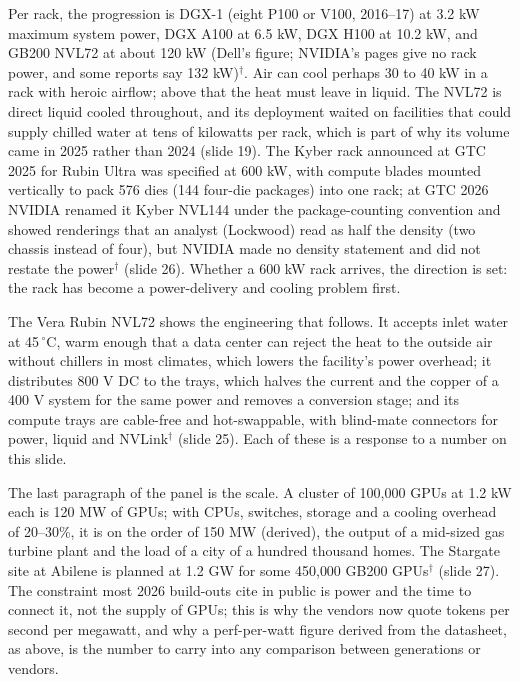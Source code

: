 \documentclass[11pt,letterpaper]{article}
\begin{document}
Per rack, the progression is DGX-1 (eight P100 or V100, 2016--17) at 3.2 kW maximum system power, DGX A100 at 6.5 kW, DGX H100 at 10.2 kW, and GB200 NVL72 at about 120 kW (Dell's figure; NVIDIA's pages give no rack power, and some reports say 132 kW)$^\dagger$. Air can cool perhaps 30 to 40 kW in a rack with heroic airflow; above that the heat must leave in liquid. The NVL72 is direct liquid cooled throughout, and its deployment waited on facilities that could supply chilled water at tens of kilowatts per rack, which is part of why its volume came in 2025 rather than 2024 (slide 19). The Kyber rack announced at GTC 2025 for Rubin Ultra was specified at 600 kW, with compute blades mounted vertically to pack 576 dies (144 four-die packages) into one rack; at GTC 2026 NVIDIA renamed it Kyber NVL144 under the package-counting convention and showed renderings that an analyst (Lockwood) read as half the density (two chassis instead of four), but NVIDIA made no density statement and did not restate the power$^\dagger$ (slide 26). Whether a 600 kW rack arrives, the direction is set: the rack has become a power-delivery and cooling problem first.

The Vera Rubin NVL72 shows the engineering that follows. It accepts inlet water at 45\,$^\circ$C, warm enough that a data center can reject the heat to the outside air without chillers in most climates, which lowers the facility's power overhead; it distributes 800 V DC to the trays, which halves the current and the copper of a 400 V system for the same power and removes a conversion stage; and its compute trays are cable-free and hot-swappable, with blind-mate connectors for power, liquid and NVLink$^\dagger$ (slide 25). Each of these is a response to a number on this slide.

The last paragraph of the panel is the scale. A cluster of 100{,}000 GPUs at 1.2 kW each is 120 MW of GPUs; with CPUs, switches, storage and a cooling overhead of 20--30\%, it is on the order of 150 MW (derived), the output of a mid-sized gas turbine plant and the load of a city of a hundred thousand homes. The Stargate site at Abilene is planned at 1.2 GW for some 450{,}000 GB200 GPUs$^\dagger$ (slide 27). The constraint most 2026 build-outs cite in public is power and the time to connect it, not the supply of GPUs; this is why the vendors now quote tokens per second per megawatt, and why a perf-per-watt figure derived from the datasheet, as above, is the number to carry into any comparison between generations or vendors.
\end{document}
